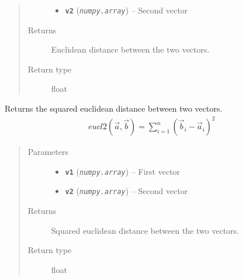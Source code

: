 \documentclass[letterpaper,10pt,english]{sphinxmanual}
\begin{document}
\begin{fulllineitems}
\begin{fulllineitems}
\begin{quote}
\begin{description}
\begin{itemize}
\item {} 
\textbf{\texttt{v2}} (\emph{\texttt{numpy.array}}) -- Second vector

\end{itemize}

\item[{Returns}] \leavevmode
Euclidean distance between the two vectors.

\item[{Return type}] \leavevmode
float

\end{description}\end{quote}

\end{fulllineitems}


\begin{fulllineitems}
\label{src.mapping:src.mapping.mapthreading.MappingWorkerThread.euclidean_distance2}
Returns the squared euclidean distance between two vectors.
\begin{equation*}
\begin{split}eucl2(\vec{a}, \vec{b}) = \sum_{i=1}^n (\vec{b}_i - \vec{a}_i)^2\end{split}
\end{equation*}\begin{quote}\begin{description}
\item[{Parameters}] \leavevmode\begin{itemize}
\item {} 
\textbf{\texttt{v1}} (\emph{\texttt{numpy.array}}) -- First vector

\item {} 
\textbf{\texttt{v2}} (\emph{\texttt{numpy.array}}) -- Second vector

\end{itemize}

\item[{Returns}] \leavevmode
Squared euclidean distance between the two vectors.

\item[{Return type}] \leavevmode
float

\end{description}\end{quote}

\end{fulllineitems}


\end{fulllineitems}
\end{document}
